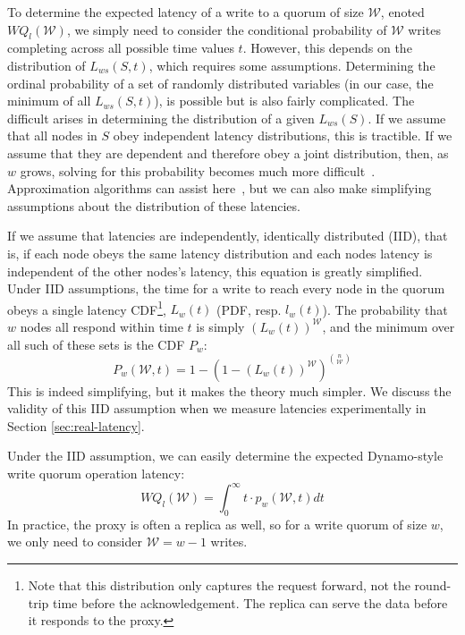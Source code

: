 \documentclass{vldb}
\begin{document}
To determine the expected latency of a write to a quorum of size
$\mathcal{W}$, enoted $WQ_l(\mathcal{W})$, we simply need to consider
the conditional probability of $\mathcal{W}$ writes completing across
all possible time values $t$.  However, this depends on the
distribution of $L_{ws}(S, t)$, which requires some
assumptions. Determining the ordinal probability of a set of randomly
distributed variables (in our case, the minimum of all $L_{ws}(S,
t)$), is possible but is also fairly complicated.  The difficult
arises in determining the distribution of a given $L_{ws}(S)$.  If we
assume that all nodes in $S$ obey independent latency distributions,
this is tractible.  If we assume that they are dependent and therefore
obey a joint distribution, then, as $w$ grows, solving for this
probability becomes much more difficult~\cite{needed}.  Approximation
algorithms can assist here~\cite{needed}, but we can also make
simplifying assumptions about the distribution of these latencies.

If we assume that latencies are independently, identically distributed
(IID), that is, if each node obeys the same latency distribution and
each nodes latency is independent of the other nodes's latency, this
equation is greatly simplified.  Under IID assumptions, the time for a
write to reach every node in the quorum obeys a single latency
CDF\footnote{Note that this distribution only captures the request
  forward, not the round-trip time before the acknowledgement.  The
  replica can serve the data before it responds to the proxy.},
$L_w(t)$ (PDF, resp. $l_w(t)$).  The probability that $w$ nodes all
respond within time $t$ is simply $(L_w(t))^\mathcal{W}$, and the
minimum over all such of these sets is the CDF $P_w$:
\begin{equation}
P_w(\mathcal{W}, t) = 1-(1-(L_w(t))^\mathcal{W})^{n \choose \mathcal{W}}
\end{equation}
This is indeed simplifying, but it makes the theory much simpler.  We
discuss the validity of this IID assumption when we measure latencies
experimentally in Section \ref{sec:real-latency}.

Under the IID assumption, we can easily determine the expected
Dynamo-style write quorum operation latency:
\begin{equation}
WQ_l(\mathcal{W}) = \int_0^{\infty} t \cdot p_w(\mathcal{W}, t) dt
\end{equation}
In practice, the proxy is often a replica as well, so for a write
quorum of size $w$, we only need to consider $\mathcal{W}=w-1$ writes.
\end{document}
